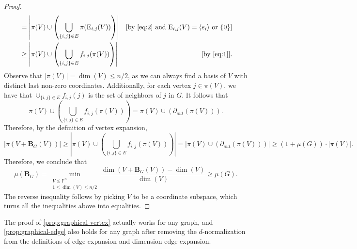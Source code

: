 \documentclass{toc}
\theoremstyle{plain}
\numberwithin{equation}{section}
\theoremstyle{definition}
\newcommand{\F}{\mathbb{F}}
\newcommand{\tuple}[1]{\mathbf{#1}}
\newcommand{\vB}{\tuple{B}}
\newcommand{\E}{\mathrm{E}}
\begin{document}
\begin{proof}
\begin{align*}
        &=\left|\pi(V)\cup\left(\bigcup_{\{i,j\}\in E}\pi(\E_{i,j}(V))\right)\right|&[\text{by \eqref{eq:2} and }\E_{i,j}(V) = \langle e_i\rangle\text{ or }\{0\}]\\
        &\geq\left|\pi(V)\cup\left(\bigcup_{\{i,j\}\in E}f_{i,j}(\pi(V))\right)\right|&[\text{by \eqref{eq:1}}].
    \end{align*}
     Observe that $|\pi(V)|=\dim(V)\leq n/2$, as we can always find a basis of $V$ with distinct last non-zero coordinates. Additionally, for each vertex $j\in\pi(V)$, we have that $\cup_{\{i,j\}\in E}f_{i,j}(j)$ is the set of neighbors of $j$ in $G$. It follows that
     $$
     \pi(V)\cup\left(\bigcup_{\{i,j\}\in E}f_{i,j}(\pi(V))\right)=\pi(V)\cup\left(\partial_{out}(\pi(V))\right).
     $$
     Therefore, by the definition of vertex expansion,
     $$
    |\pi(V+\vB_G(V))|\geq \left|\pi(V)\cup\left(\bigcup_{\{i,j\}\in E}f_{i,j}(\pi(V))\right)\right|=\left|\pi(V)\cup\left(\partial_{out}(\pi(V))\right)\right|\geq (1+\mu(G))\cdot|\pi(V)|.
     $$
     Therefore, we conclude that
     \[
     \mu(\vB_G)=\min_{\substack{V\leq \F^n \\1\leq\dim(V)\leq n/2}} \frac{\dim(V+\vB_G(V))-\dim(V)}{\dim(V)}\geq \mu(G).
     \]
     The reverse inequality follows by picking $V$ to be a coordinate subspace, which turns all the inequalities above into equalities.
\end{proof}
\begin{remark}
  The proof of \cref{prop:graphical-vertex} actually works for any graph, and \cref{prop:graphical-edge} also holds for any graph after removing the $d$-normalization from the definitions of edge expansion and dimension edge expansion.
\end{remark}
\end{document}
